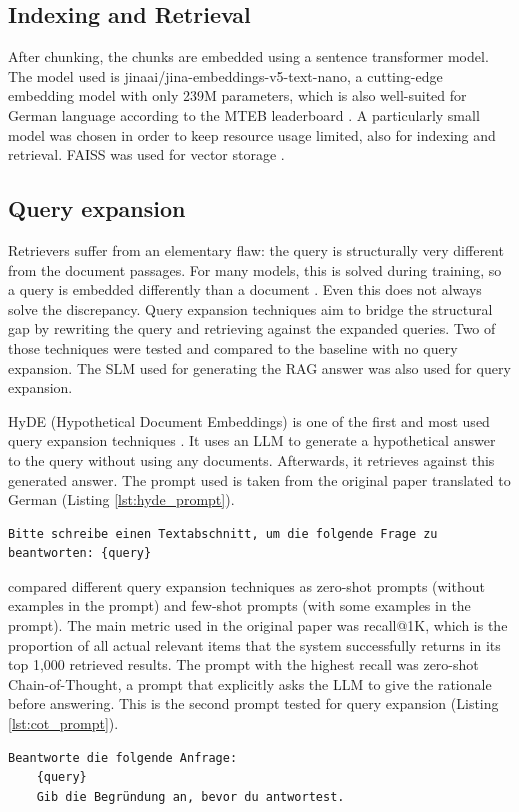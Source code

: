 \documentclass[12pt]{article} %
\begin{document}
\subsection{Indexing and Retrieval}
After chunking, the chunks are embedded using a sentence transformer model. The model used is jinaai/jina-embeddings-v5-text-nano, a cutting-edge embedding model with only 239M parameters, which is also well-suited for German language according to the MTEB leaderboard \parencite{akram2026jina,muennighoff2022mteb,enevoldsen2025mmtebmassivemultilingualtext}. A particularly small model was chosen in order to keep resource usage limited, also for indexing and retrieval. FAISS was used for vector storage \parencite{douze2024faiss}.
\subsection{Query expansion}
Retrievers suffer from an elementary flaw: the query is structurally very different from the document passages. For many models, this is solved during training, so a query is embedded differently than a document \parencite{akram2026jina}. Even this does not always solve the discrepancy. Query expansion techniques aim to bridge the structural gap by rewriting the query and retrieving against the expanded queries. Two of those techniques were tested and compared to the baseline with no query expansion. The SLM used for generating the RAG answer was also used for query expansion.

HyDE (Hypothetical Document Embeddings) is one of the first and most used query expansion techniques \parencite{gao2023precise}. It uses an LLM to generate a hypothetical answer to the query without using any documents. Afterwards, it retrieves against this generated answer. The prompt used is taken from the original paper translated to German (Listing \ref{lst:hyde_prompt}).
\begin{lstlisting}[breaklines=true, basicstyle=\ttfamily, label=lst:hyde_prompt, caption=Prompt for HyDE Query Expansion]
    Bitte schreibe einen Textabschnitt, um die folgende Frage zu beantworten: {query}
\end{lstlisting}
\textcite{jagerman2023query} compared different query expansion techniques as zero-shot prompts (without examples in the prompt) and few-shot prompts (with some examples in the prompt). The main metric used in the original paper was recall@1K, which is the proportion of all actual relevant items that the system successfully returns in its top 1,000 retrieved results. The prompt with the highest recall was zero-shot Chain-of-Thought, a prompt that explicitly asks the LLM to give the rationale before answering. This is the second prompt tested for query expansion (Listing \ref{lst:cot_prompt}).
\begin{lstlisting}[breaklines=true, basicstyle=\ttfamily, label=lst:cot_prompt, caption=Prompt for CoT Query Expansion]
    Beantworte die folgende Anfrage:
    {query}
    Gib die Begründung an, bevor du antwortest.\end{lstlisting}
\end{document}
